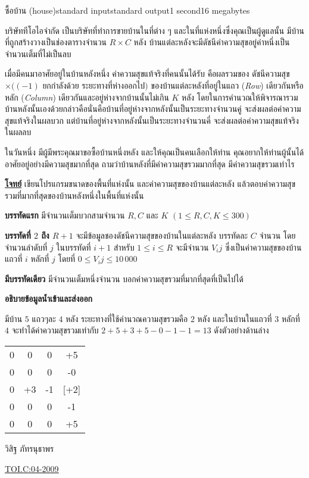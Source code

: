 \documentclass[11pt,a4paper]{article}
\begin{document}
\begin{problem}{ซื้อบ้าน (house)}{standard input}{standard output}{1 second}{16 megabytes}

บริษัททีโอไอจำกัด เป็นบริษัทที่ทำการขายบ้านในที่ต่าง ๆ และในที่แห่งหนึ่งซึ่งคุณเป็นผู้ดูแลนั้น มีบ้านที่ถูกสร้างวางเป็นช่องตารางจำนวน $R \times C$ หลัง บ้านแต่ละหลังจะมีดัชนีค่าความสุขอยู่ค่าหนึ่งเป็นจำนวนเต็มที่ไม่เป็นลบ

    เมื่อมีคนมาอาศัยอยู่ในบ้านหลังหนึ่ง ค่าความสุขแท้จริงที่คนนั้นได้รับ คือผลรวมของ ดัชนีความสุข$\times ((-1)$ ยกกำลังด้วย ระยะทางที่ห่างออกไป$)$ ของบ้านแต่ละหลังที่อยู่ในแถว (\textit{Row}) เดียวกันหรือหลัก (\textit{Column}) เดียวกันและอยู่ห่างจากบ้านนั้นไม่เกิน $K$ หลัง โดยในการคำนวณให้พิจารณารวมบ้านหลังนั้นเองด้วยกล่าวคือนั่นคือบ้านที่อยู่ห่างจากหลังนั้นเป็นระยะทางจำนวนคู่ จะส่งผลต่อค่าความสุขแท้จริงในผลบวก แต่บ้านที่อยู่ห่างจากหลังนั้นเป็นระยะทางจำนวนคี่ จะส่งผลต่อค่าความสุขแท้จริงในผลลบ

    ในวันหนึ่ง มีผู้มีพระคุณมาขอซื้อบ้านหนึ่งหลัง และให้คุณเป็นคนเลือกให้ท่าน คุณอยากให้ท่านผู้นั้นได้อาศัยอยู่อย่างมีความสุขมากที่สุด ถามว่าบ้านหลังที่มีค่าความสุขรวมมากที่สุด มีค่าความสุขรวมเท่าไร

\bigskip
\underline{\textbf{โจทย์}}  เขียนโปรแกรมขนาดของพื้นที่แห่งนั้น และค่าความสุขของบ้านแต่ละหลัง แล้วตอบค่าความสุขรวมที่มากที่สุดของบ้านหลังหนึ่งในพื้นที่แห่งนั้น

\InputFile

\textbf{บรรทัดแรก} มีจำนวนเต็มบวกสามจำนวน $R, C$ และ $K$ $(1 \leq R,C,K \leq 300)$

\textbf{บรรทัดที่ $2$ ถึง $R+1$} จะมีข้อมูลชองดัชนีความสุขของบ้านในแต่ละหลัง บรรทัดละ $C$ จำนวน โดยจำนวนลำดับที่ $j$ ในบรรทัดที่ $i+1$ สำหรับ $1 \leq i \leq R$  จะมีจำนวน $V_ij$ ซึ่งเป็นค่าความสุขของบ้านแถวที่ $i$ หลักที่ $j$ โดยที่ $0 \leq V_ij \leq 10\,000$


\OutputFile

\textbf{มีบรรทัดเดียว} มีจำนวนเต็มหนึ่งจำนวน บอกค่าความสุขรวมที่มากที่สุดที่เป็นไปได้

\Examples

\begin{example}
%
\end{example}

\Note 

\textbf{อธิบายข้อมูลน้ำเข้าและส่งออก}

      มีบ้าน $5$ แถวๆละ $4$ หลัง ระยะทางที่ใช้คำนวณความสุขรวมคือ $2$ หลัง และในบ้านในแถวที่ $3$ หลักที่ $4$ จะทำได้ค่าความสุขรวมเท่ากับ $2 + 5 + 3 + 5 - 0 - 1 - 1 = 13$ ดังตัวอย่างด้านล่าง

\begin{center}
\begin{tabular}{cccc}
0   & 0  &  0 &  +5\\
0   & 0 &   0  & -0\\
0  & +3 &  -1 & [+2]\\
0  & 0 &   0 &  -1\\
0  &  0 &   0 &  +5\\
\end{tabular}
\end{center}
\Source

วิสิฐ ภัทรนุธาพร

\underline{\href{http://www.thailandoi.org/toi.c/04-2009}{TOI.C:04-2009}}

\end{problem}
\end{document}
